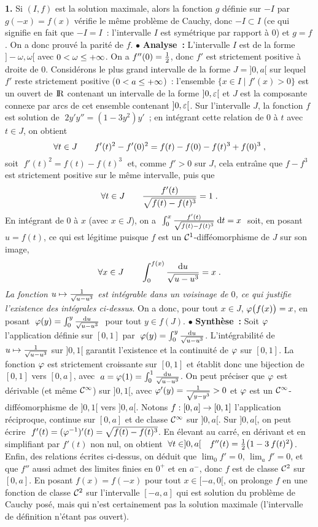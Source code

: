 \documentclass{article}
\begin{document}
\msk
\cl{- - - - - - - - - - - - - - - - - - - - - - - - - - - - - - - }
\msk

{\bf 1.} Si $(I,f)$ est la solution maximale, alors la fonction $g$ d\'efinie sur $-I$ par $g(-x)=f(x)$ v\'erifie le m\^eme probl\`eme de Cauchy, donc $-I\subset I$ (ce qui signifie en fait que $-I=I$~: l'intervalle $I$ est sym\'etrique par rapport \`a 0) et $g=f$. On a donc prouv\'e la parit\'e de $f$.\ssk\sect
$\bullet$ {\bf Analyse~:} 
L'intervalle $I$ est de la forme $]-\omega,\omega[$ avec $0<\omega\leq+\infty$. On a $f''(0)={1\over2}$, donc $f'$ est strictement positive \`a droite de 0. Consid\'erons le plus grand intervalle de la forme $J=]0,a[$ sur lequel $f'$ reste strictement positive ($0<a\leq+\infty$)~: l'ensemble $\{x\in I\;|\;f'(x)>0\}$ est un ouvert de ${\rm I\kern-0.6mm R}$ contenant un intervalle de la forme $]0,\varepsilon[$ et $J$ est la composante connexe par arcs de cet ensemble contenant $]0,\varepsilon[$.\ssk\sect
Sur l'intervalle $J$, la fonction $f$ est solution de $\;2y'y''=(1-3y^2)y'$~; en int\'egrant cette relation de 0 \`a $t$ avec $t\in J$, on obtient\vv
$$\forall t\in J\qquad f'(t)^2-f'(0)^2=f(t)-f(0)-f(t)^3+f(0)^3\;,$$
soit $\;f'(t)^2=f(t)-f(t)^3\;$ et, comme $f'>0$ sur $J$, cela entra\^\i ne que $f-f^3$ est strictement positive sur le m\^eme intervalle, puis que\vv
$$\forall t\in J\qquad {f'(t)\over\sqrt{f(t)-f(t)^3}}=1\;.$$
En int\'egrant de 0 \`a $x$ (avec $x\in J$), on a $\;\int_0^x{f'(t)\over\sqrt{f(t)-f(t)^3}}\;{\rm d}t=x\;$ soit, en posant $u=f(t)$, ce qui est l\'egitime puisque $f$ est un ${\cal C}^1$-diff\'eomorphisme de $J$ sur son image,\vv
$$\forall x\in J\qquad \int_0^{f(x)}{{\rm d}u\over\sqrt{u-u^3}}=x\;.$$
{\it La fonction $u\mapsto{1\over\sqrt{u-u^3}}$ est int\'egrable dans un voisinage de $0$, ce qui justifie l'existence des int\'egrales ci-dessus}.\ssk\sect
On a donc, pour tout $x\in J$, $\varphi\big(f(x)\big)=x$, en posant $\;\varphi(y)=\int_0^y{{\rm d}u\over\sqrt{u-u^3}}\;$ pour tout $y\in f(J)$.
\msk\sect
$\bullet$ {\bf Synth\`ese~:} Soit $\varphi$ l'application d\'efinie sur $[0,1]$ par $\;\varphi(y)=\int_0^y{{\rm d}u\over\sqrt{u-u^3}}$. L'int\'egrabilit\'e de $u\mapsto{1\over\sqrt{u-u^3}}$ sur $]0,1[$ garantit l'existence et la continuit\'e de $\varphi$ sur $[0,1]$. La fonction $\varphi$ est strictement croissante sur $[0,1]$ et \'etablit donc une bijection de $[0,1]$ vers $[0,a]$, avec $\;a=\varphi(1)=\int_0^1{{\rm d}u\over\sqrt{u-u^3}}$. On peut pr\'eciser que $\varphi$ est d\'erivable (et m\^eme ${\cal C}^{\infty}$) sur $]0,1[$, avec $\varphi'(y)={1\over\sqrt{y-y^3}}>0$ et $\varphi$ est un ${\cal C}^{\infty}$-diff\'eomorphisme de $]0,1[$ vers $]0,a[$. Notons $f:[0,a]\rightarrow[0,1]$ l'application r\'eciproque, continue sur $[0,a]$ et de classe ${\cal C}^{\infty}$ sur $]0,a[$. Sur $]0,a[$, on peut \'ecrire $\;f'(t)=(\varphi^{-1})'(t)=\sqrt{f(t)-f(t)^3}$. En \'elevant au carr\'e, en d\'erivant et en simplifiant par $f'(t)$ non nul, on obtient $\;\forall t\in]0,a[\quad f''(t)={1\over2}\big(1-3\>f(t)^2\big)$. Enfin, des relations \'ecrites ci-dessus, on d\'eduit que $\lim_0f'=0$, $\lim_af'=0$, et que $f''$ aussi admet des limites finies en $0^+$ et en $a^-$, donc $f$ est de classe ${\cal C}^2$ sur $[0,a]$. En posant $f(x)=f(-x)$ pour tout $x\in[-a,0[$, on prolonge $f$ en une fonction de classe ${\cal C}^2$ sur l'intervalle $[-a,a]$ qui est solution du probl\`eme de Cauchy pos\'e, mais qui n'est certainement pas la solution maximale (l'intervalle de d\'efinition n'\'etant pas ouvert).
\end{document}
